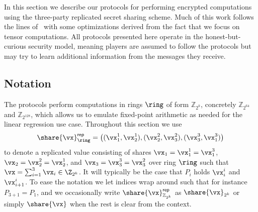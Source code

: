
In this section we describe our protocols for performing encrypted computations using the three-party replicated secret sharing scheme. Much of this work follows the lines of~\cite{CCS:AFLNO16} with some optimizations derived from the fact that we focus on tensor computations. All protocols presented here operate in the honest-but-curious security model, meaning players are assumed to follow the protocols but may try to learn additional information from the messages they receive. 






\subsection{Notation}

The protocols perform computations in rings $\ring$ of form $\mathbb{Z}_{2^{k}}$, concretely $\mathbb{Z}_{2^{64}}$ and $\mathbb{Z}_{2^{128}}$, which allows us to emulate fixed-point arithmetic as needed for the linear regression use case. Throughout this section we use
$$
\share{\vx}^{\mathsf{rep}}_\ring = \left( (\vx_1^1, \vx_2^1), (\vx_2^2, \vx_3^2), (\vx_3^3, \vx_1^3) \right)
$$
to denote a replicated value consisting of shares $\vx_1 = \vx_1^1 = \vx_1^3$, $\vx_2 = \vx_2^2 = \vx_2^1$, and $\vx_3 = \vx_3^3 = \vx_3^2$ over ring $\ring$ such that $\vx = \sum_{i=1}^3 \vx_i \in \Z_{2^k}$. It will typically be the case that $P_i$ holds $\vx_i^i$ and $\vx_{i+1}^i$. To ease the notation we let indices wrap around such that for instance $P_{3+1} = P_1$, and we occasionally write $\share{\vx}^{\mathsf{rep}}_{\mathbb{Z}_{2^k}}$ as $\share{\vx}_{2^k}$ or simply $\share{\vx}$ when the rest is clear from the context.












